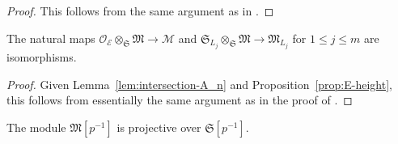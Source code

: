 \begin{proof}
This follows from the same argument as in \cite[Lem.~4.25, Pf.]{du-liu-moon-shimizu-completed-prismatic-F-crystal-loc-system}.
\end{proof}

\begin{prop} \label{prop:kisin-mod-base-change-compatible}
The natural maps $\mathcal{O}_{\mathcal{E}}\otimes_{\mathfrak{S}} \mathfrak{M} \rightarrow \mathcal{M}$ and $\mathfrak{S}_{L_j}\otimes_{\mathfrak{S}} \mathfrak{M} \rightarrow \mathfrak{M}_{L_j}$ for $1 \leq j \leq m$ are isomorphisms. 
\end{prop}

\begin{proof}
Given Lemma~\ref{lem:intersection-A_n} and Proposition~\ref{prop:E-height}, this follows from essentially the same argument as in the proof of \cite[Prop.~4.26]{du-liu-moon-shimizu-completed-prismatic-F-crystal-loc-system}.
\end{proof}

\begin{prop} \label{prop:kisin-mod-invert-p-projectivity}
The module $\mathfrak{M}[p^{-1}]$ is projective over $\mathfrak{S}[p^{-1}]$.
\end{prop}

